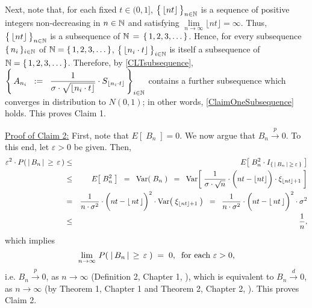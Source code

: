 \begin{enumerate}
\begin{equation}
		\end{equation}
		Next, note that, for each fixed
		$t \in (0,1]$, $\left\{\,\lfloor \overset{{\color{white}~}}{nt} \rfloor\,\right\}_{n\in\N}$
		is a sequence of positive integers non-decreasing in $n \in \mathbb{N}$ and
		satisfying $\underset{n\rightarrow\infty}{\lim}\lfloor nt \rfloor = \infty$.
		Thus, $\left\{\,\lfloor \overset{{\color{white}~}}{nt} \rfloor\,\right\}_{n\in\N}$ is a
		subsequence of $\mathbb{N} \,=\, \left\{\,1,2,3,\ldots\,\right\}$.
		Hence, for every subsequence $\{\,n_{i}\,\}_{i\in\mathbb{N}}$ of $\mathbb{N} = \{\,1,2,3,\ldots\,\}$,
		$\left\{\,\lfloor \overset{{\color{white}~}}{n_{i}\cdot t} \rfloor\,\right\}_{i\in\N}$
		is itself a subsequence of $\mathbb{N} = \{\,1,2,3,\ldots\,\}$.
		Therefore, by \eqref{CLTsubsequence},
		$
		\left\{\,
		A_{n_{i}}
		\;\; := \;\;
		\dfrac{1}{\sigma\cdot\sqrt{\lfloor n_{i}\cdot t \rfloor}}
		\cdot
		S_{\lfloor n_{i}\cdot t \rfloor}
		\,\right\}_{i \in \mathbb{N}}
		$
		contains a further subsequence which converges in distribution to $N(0,1)$;
		in other words, \eqref{ClaimOneSubsequence} holds.
		This proves Claim 1.
		
		\vskip 0.5cm
		\noindent
		\underline{Proof of Claim 2:}\quad
		First, note that $E\!\left[\;B_{n}\;\right] = 0$.
		We now argue that $B_{n} \overset{p}{\longrightarrow} 0$.
		To this end, let $\varepsilon > 0$ be given.
		Then,
		\begin{eqnarray*}
		\varepsilon^{2} \cdot P\!\left(\,\vert\,B_{n}\,\vert\,\geq\,\varepsilon\,\right)
		&\leq& E\!\left[\;B^{2}_{n} \cdot I_{\{\,\vert\,B_{n}\,\vert\,\geq\,\varepsilon\,\}}\;\right]
		\\
		&\leq& E\!\left[\;B_{n}^{2}\;\right]
		\;\;=\;\; \Var\!\left(\;B_{n}\;\right)
		\;\;=\;\;
			\Var\!\left[\;
				\dfrac{1}{\sigma\cdot\sqrt{n}}
				\cdot
				\left(\overset{{\color{white}1}}{nt} - \lfloor nt \rfloor\right)
				\cdot
				\xi_{\lfloor nt \rfloor + 1}
			\;\right]
		\\
		&=&
			\dfrac{1}{n\cdot\sigma^{2}}
			\cdot
			\left(\overset{{\color{white}1}}{nt} - \lfloor\,nt\,\rfloor\right)^{2}
			\cdot
			\Var\!\left(\;\xi_{\lfloor nt \rfloor + 1}\;\right)
		\;\;=\;\;
			\dfrac{1}{n\cdot\sigma^{2}}
			\cdot
			\left(\overset{{\color{white}1}}{nt} - \lfloor\,nt\,\rfloor\right)^{2}
			\cdot
			\sigma^{2}
		\\
		&\leq& \dfrac{1}{n},
		\end{eqnarray*}
		which implies
		\begin{equation*}
		\lim_{n\rightarrow\infty}\,P\!\left(\;\vert\,B_{n}\,\vert\,\geq\,\varepsilon\;\right) \; = \; 0,
		\;\;
		\textnormal{for each $\varepsilon > 0$},
		\end{equation*}
		i.e. $B_{n}\overset{p}{\longrightarrow}0$, as $n\longrightarrow\infty$
		(Definition 2, Chapter 1, \cite{Ferguson1996}),
		which is equivalent to $B_{n}\overset{d}{\longrightarrow}0$, as $n\longrightarrow\infty$
		(by Theorem 1, Chapter 1 and Theorem 2, Chapter 2, \cite{Ferguson1996}).
		This proves Claim 2.


\end{enumerate}
